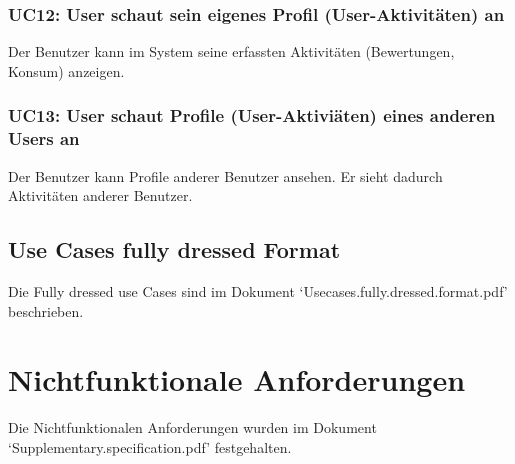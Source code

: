 \documentclass[10pt,a4paper]{scrartcl}
\begin{document}
\subsubsection*{UC12: User schaut sein eigenes Profil (User-Aktivitäten) an}
Der Benutzer kann im System seine erfassten Aktivitäten (Bewertungen, Konsum) anzeigen.

\subsubsection*{UC13: User schaut Profile (User-Aktiviäten) eines anderen Users an}
Der Benutzer kann Profile anderer Benutzer ansehen. Er sieht dadurch Aktivitäten anderer Benutzer.


\subsection{Use Cases fully dressed Format}
Die Fully dressed use Cases sind im Dokument `Usecases.fully.dressed.format.pdf' beschrieben.


\section{Nichtfunktionale Anforderungen}
Die Nichtfunktionalen Anforderungen wurden im Dokument `Supplementary.specification.pdf' festgehalten.
\end{document}
